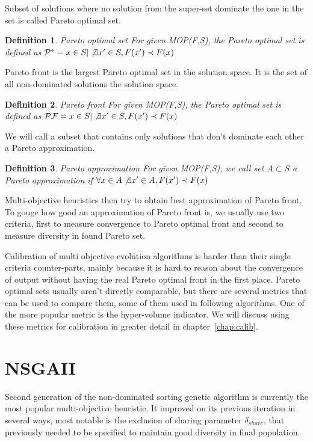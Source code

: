 \documentclass[12pt,oneside]{fithesis2}
\newtheorem{defn}{Definition}
\begin{document}
Subset of solutions where no solution from the super-set dominate the one in the set is called Pareto optimal set.

\begin{defn}{Pareto optimal set}
  For given MOP(F,S), the Pareto optimal set is defined as ${\cal{
P}^*} = {x \in S | \not \exists x' \in S, F(x') \prec F(x)}$
\end{defn}

Pareto front is the largest Pareto optimal set in the solution space. It is the set of all non-dominated solutions the solution space. 

\begin{defn}{Pareto front}
  For given MOP(F,S), the Pareto optimal set is defined as ${\cal
{PF}} = {x \in S | \not \exists x' \in S, F(x') \prec F(x)} $
\end{defn}

We will call a subset that contains only solutions that don't dominate each other a Pareto approximation.

\begin{defn}{Pareto approximation}
  For given MOP(F,S), we call set $A \subset S$ a  Pareto approximation if $\forall x \in A \not \exists x' \in A, F(x') \prec F(x)$
\end{defn}

Multi-objective heuristics then try to obtain best approximation of Pareto front. To gouge how good an approximation of Pareto front is, we usually use two criteria, first to measure convergence to Pareto optimal front and second to measure diversity in found Pareto set.

Calibration of multi objective evolution algorithms is harder than their single criteria counter-parts, mainly because it is hard to reason about the convergence of output without having the real Pareto optimal front in the first place. Pareto optimal sets usually aren't directly comparable, but there are several metrics that can be used to compare them, some of them used in following algorithms. One of the more popular metric is the hyper-volume indicator. We will discuss using these metrics for calibration in greater detail in chapter~\ref{chap:calib}.

\section{NSGAII}
Second generation of the non-dominated sorting genetic algorithm\cite{deb2002fast} is currently the most popular multi-objective heuristic. It improved on its previous iteration in several ways, most notable is the exclusion of sharing parameter $\delta_{share}$, that previously needed to be specified to maintain good diversity in final population.
\end{document}
